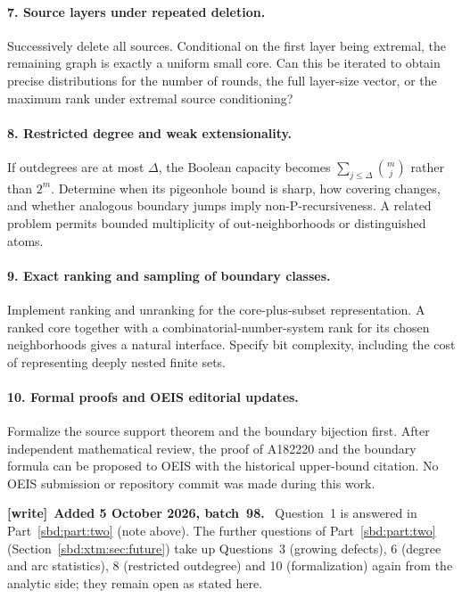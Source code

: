 \documentclass[11pt,a4paper]{article}
\theoremstyle{definition}
\newenvironment{writenote}[1][]{\par\smallskip\begingroup\small
 \noindent\textbf{[write]}\if\relax\detokenize{#1}\relax\else~\textbf{#1.}\fi\ }%
 {\par\endgroup\smallskip}
\begin{document}
\paragraph{7. Source layers under repeated deletion.}
Successively delete all sources. Conditional on the first layer being
extremal, the remaining graph is exactly a uniform small core. Can this
be iterated to obtain precise distributions for the number of rounds,
the full layer-size vector, or the maximum rank under extremal source
conditioning?

\paragraph{8. Restricted degree and weak extensionality.}
If outdegrees are at most $\Delta$, the Boolean capacity becomes
$\sum_{j\le\Delta}\binom mj$ rather than $2^m$. Determine when its
pigeonhole bound is sharp, how covering changes, and whether analogous
boundary jumps imply non-P-recursiveness. A related problem permits
bounded multiplicity of out-neighborhoods or distinguished atoms.

\paragraph{9. Exact ranking and sampling of boundary classes.}
Implement ranking and unranking for the core-plus-subset representation.
A ranked core together with a combinatorial-number-system rank for its
chosen neighborhoods gives a natural interface. Specify bit complexity,
including the cost of representing deeply nested finite sets.

\paragraph{10. Formal proofs and OEIS editorial updates.}
Formalize the source support theorem and the boundary bijection first.
After independent mathematical review, the proof of A182220 and the
boundary formula can be proposed to OEIS with the historical upper-bound
citation. No OEIS submission or repository commit was made during this
work.

\begin{writenote}[Added 5 October 2026, batch~98]
Question~1 is answered in Part~\ref{sbd:part:two} (note above). The
further questions of Part~\ref{sbd:part:two}
(Section~\ref{sbd:xtm:sec:future}) take up Questions~3 (growing defects),
6 (degree and arc statistics), 8 (restricted outdegree) and 10
(formalization) again from the analytic side; they remain open as stated
here.
\end{writenote}
\end{document}
